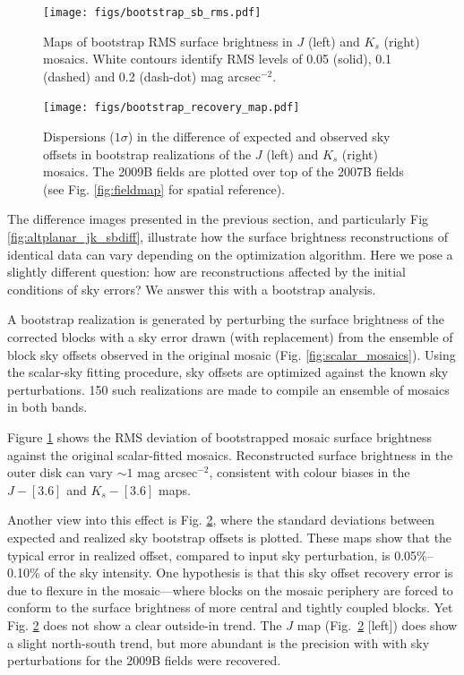 \documentclass[iop]{emulateapj}
\begin{document}
\begin{figure}[t]
    \centering
        \texttt{[image: figs/bootstrap\_sb\_rms.pdf]}
    \caption{Maps of bootstrap RMS surface brightness in $J$ (left) and $K_s$ (right) mosaics. White contours identify RMS levels of 0.05 (solid), 0.1 (dashed) and 0.2 (dash-dot) mag arcsec$^{-2}$.}
    \label{fig:bootstrap_sb_rms}
\end{figure}

\begin{figure}[t]
    \centering
        \texttt{[image: figs/bootstrap\_recovery\_map.pdf]}
    \caption{Dispersions ($1\sigma$) in the difference of expected and observed sky offsets in bootstrap realizations of the $J$ (left) and $K_s$ (right) mosaics. The 2009B fields are plotted over top of the 2007B fields (see Fig. \ref{fig:fieldmap} for spatial reference).}
    \label{fig:bootstrap_recovery_map}
\end{figure}


The difference images presented in the previous section, and particularly Fig \ref{fig:altplanar_jk_sbdiff}, illustrate how the surface brightness reconstructions of identical data can vary depending on the optimization algorithm. Here we pose a slightly different question: how are reconstructions affected by the initial conditions of sky errors? We answer this with a bootstrap analysis.

A bootstrap realization is generated by perturbing the surface brightness of the corrected blocks with a sky error drawn (with replacement) from the ensemble of block sky offsets observed in the original mosaic (Fig. \ref{fig:scalar_mosaics}). Using the scalar-sky fitting procedure, sky offsets  are optimized against the known sky perturbations. 150 such realizations are made to compile an ensemble of mosaics in both bands.

Figure \ref{fig:bootstrap_sb_rms} shows the RMS deviation of bootstrapped mosaic surface brightness against the original scalar-fitted mosaics. Reconstructed surface brightness in the outer disk can vary $\sim 1$ mag arcsec$^{-2}$, consistent with colour biases in the $J-[3.6]$ and $K_s-[3.6]$ maps.

Another view into this effect is Fig. \ref{fig:bootstrap_recovery_map}, where the standard deviations between expected and realized sky bootstrap offsets is plotted. These maps show that the typical error in realized offset, compared to input sky perturbation, is 0.05\%--0.10\% of the sky intensity. One hypothesis is that this sky offset recovery error is due to flexure in the mosaic---where blocks on the mosaic periphery are forced to conform to the surface brightness of more central and tightly coupled blocks. Yet Fig. \ref{fig:bootstrap_recovery_map} does not show a clear outside-in trend. The $J$ map (Fig.~\ref{fig:bootstrap_recovery_map} [left]) does show a slight north-south trend, but more abundant is the precision with with sky perturbations for the 2009B fields were recovered.
\end{document}
